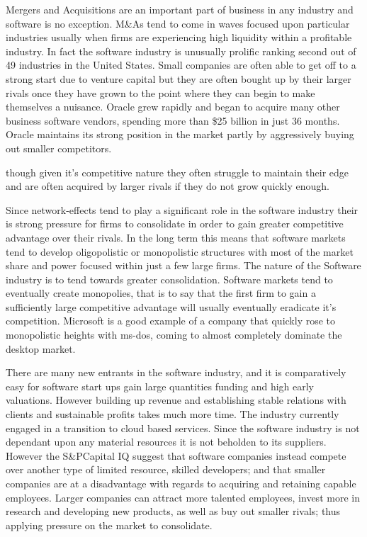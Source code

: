 Mergers and Acquisitions are an important part of business in any industry and software is no exception.\autocite[421]{schief2013mergers}
M\&As tend to come in waves focused upon particular industries usually when firms are experiencing high liquidity within a profitable industry.\autocite[421]{schief2013mergers}
In fact the software industry is unusually prolific ranking second out of 49 industries in the United States.\autocite[421]{schief2013mergers}
Small companies are often able to get off to a strong start due to venture capital but they are often bought up by their larger rivals once they have grown to the point where they can begin to make themselves a nuisance. \autocite[]{LargeParadigmShiftCloudComputing}
Oracle grew rapidly and began to acquire many other business software vendors, spending more than \$25 billion in just 36 months.\autocite[114]{finkle2012larry}
Oracle maintains its strong position in the market partly by aggressively buying out smaller competitors.\autocite[121]{finkle2012larry}

though given it's competitive nature they often struggle to maintain their edge and are often acquired by larger rivals if they do not grow quickly enough.\autocite[]{ValuelineOverview}

Since network-effects tend to play a significant role in the software industry their is strong pressure for firms to consolidate in order to gain greater competitive advantage over their rivals.\autocite[422]{schief2013mergers}
In the long term this means that software markets tend to develop oligopolistic or monopolistic structures with most of the market share and power focused within just a few large firms.\autocite[422]{schief2013mergers}
The nature of the Software industry is to tend towards greater consolidation.\autocite[]{LargeParadigmShiftCloudComputing}
Software markets tend to eventually create monopolies, that is to say that the first firm to gain a sufficiently large competitive advantage will usually eventually eradicate it's competition.\autocite[4]{buxmann2012software}
Microsoft is a good example of a company that quickly rose to monopolistic heights with ms-dos, coming to almost completely dominate the desktop market.\autocite[4]{buxmann2012software}

There are many new entrants in the software industry, and it is comparatively easy for software start ups gain large quantities funding and high early valuations. However building up revenue and establishing stable relations with clients and sustainable profits takes much more time.\autocite[39]{SurveysSoftware2015}
The industry currently engaged in a transition to cloud based services.\autocite[39]{SurveysSoftware2015}
Since the software industry is not dependant upon any material resources it is not beholden to its suppliers. However the S\&PCapital IQ suggest that software companies instead compete over another type of limited resource, skilled developers; and that smaller companies are at a disadvantage with regards to acquiring and retaining capable employees.\autocite[39]{SurveysSoftware2015}
Larger companies can attract more talented employees, invest more in research and developing new products, as well as buy out smaller rivals; thus applying pressure on the market to consolidate.\autocite[34]{IndustrySurveysInternet}

